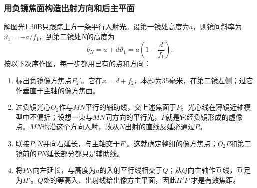 \documentclass[UTF8,fontset=fandol,a4paper,11pt]{ctexart}
\begin{document}
\subsubsection*{用负镜焦面构造出射方向和后主平面}
解图光1.30B只跟踪上方一条平行入射光。设第一镜处高度为$a$，则镜间斜率为$\vartheta_1=-a/f_1$，到第二镜处$N$的高度为
\[
b_N=a+d\vartheta_1=a\left(1-\frac d{f_1}\right).
\]
按以下次序作图，每一步都用已有的点和方向：
\begin{enumerate}
\item 标出负镜像方焦点$F_2'$。它在$x=d+f_2$，本题为35毫米，在第二镜左侧；过它作垂直于主轴的像方焦面。
\item 过负镜光心$O_2$作与$MN$平行的辅助线，交上述焦面于$P$。光心线在薄镜近轴模型中不偏折；设想一束与$MN$同方向的平行光，$P$就是它经负镜形成的虚像点。$MN$也沿这个方向入射，故从$N$出射的直线反延必通过$P$。
\item 联接$P,N$并向右延长，与主轴交于$F'$。这就确定整组的像方焦点；$O_2P$和第二镜前的$PN$延长部分都只是辅助线。
\item 将$PN$向左延长，与高度为$a$的入射平行线相交于$Q$；从$Q$向主轴作垂线，垂足为$H'$。$Q$处的等高入、出射线给出像方主平面，因此$H'F'$才是有效焦距。
\end{enumerate}
\end{document}

